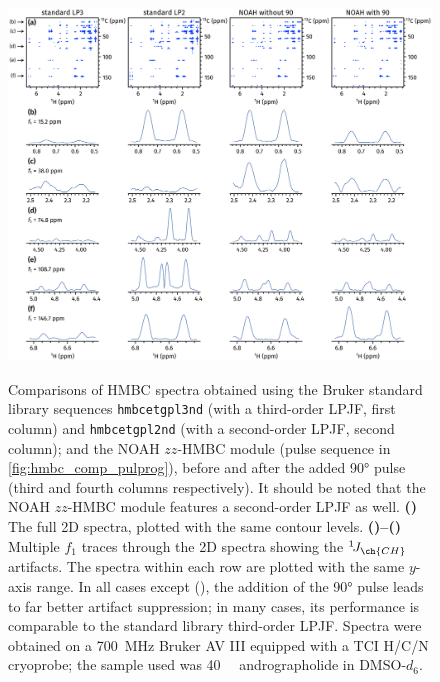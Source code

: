 \documentclass[a4paper,11pt]{article}
\newcommand{\carbon}{\ch{^{13}C}}
\newcommand{\onejch}{{}^1\!J_{\ch{CH}}}
\newcommand*{\andro}{Spectra were obtained on a \SI{700}{\MHz} Bruker AV III equipped with a TCI H/C/N cryoprobe; the sample used was \SI{40}{\milli\molar} andrographolide in DMSO-\(d_6\).}
\begin{document}
\begin{refsection}
\begin{figure}[H]
    \centering
    \includegraphics[width=\textwidth]{hmbc_si_andro.png}
    {\label{fig:hmbc_si_andro_overall}}
    {\label{fig:hmbc_si_andro_trace1}}
    {\label{fig:hmbc_si_andro_trace2}}
    {\label{fig:hmbc_si_andro_trace3}}
    {\label{fig:hmbc_si_andro_trace4}}
    {\label{fig:hmbc_si_andro_trace5}}
    \caption{
        Comparisons of HMBC spectra obtained using the Bruker standard library sequences\autocite{Cicero2001JMR} \texttt{hmbcetgpl3nd} (with a third-order LPJF, first column) and \texttt{hmbcetgpl2nd} (with a second-order LPJF, second column); and the NOAH \(zz\)-HMBC module (pulse sequence in \cref{fig:hmbc_comp_pulprog}), before and after the added \carbon{} \ang{90} pulse (third and fourth columns respectively).
        It should be noted that the NOAH \(zz\)-HMBC module features a second-order LPJF as well.
        \textbf{()} The full 2D spectra, plotted with the same contour levels.
        \textbf{()--()} Multiple \(f_1\) traces through the 2D spectra showing the \(\onejch{}\) artifacts.
        The spectra within each row are plotted with the same \(y\)-axis range.
        In all cases except (), the addition of the \ang{90} pulse leads to far better artifact suppression; in many cases, its performance is comparable to the standard library third-order LPJF.
        \andro{}
    }
    \label{fig:hmbc_si_andro}
\end{figure}


\end{refsection}
\end{document}
